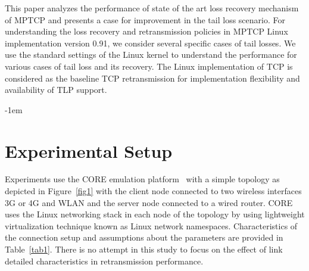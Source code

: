 \documentclass[10pt,conference,compsoc]{IEEEtran}
\begin{document}

This paper analyzes the performance of state of the art loss recovery mechanism of MPTCP and presents a case for improvement in the tail loss scenario. 
For understanding the loss recovery and retransmission policies in MPTCP Linux implementation version 0.91, we consider several specific cases of tail losses.  
We use the standard settings of the Linux kernel to understand the performance for various cases of tail loss and its recovery.
The Linux implementation of TCP is considered as the baseline TCP retransmission for implementation flexibility and availability of TLP support.

\kern-1em
\section{Experimental Setup}\label{exsetup}

Experiments use the CORE emulation platform~\cite{CORE} with a simple topology as depicted in Figure~\ref{fig1}
with the client node connected to two wireless interfaces 3G or 4G and WLAN and the server node connected to a wired router.
CORE uses the Linux networking stack in each node of the topology by using lightweight virtualization technique known as Linux network namespaces.
Characteristics of the connection setup and assumptions about the parameters are provided in Table~\ref{tab1}.
There is no attempt in this study to focus on the effect of link detailed characteristics in retransmission performance.
\end{document}
